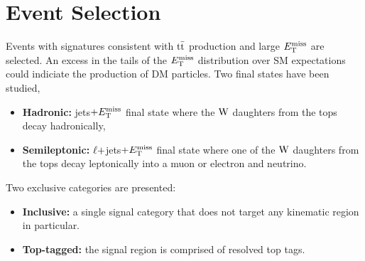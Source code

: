 \section{Event Selection}
\label{sec:selection}

Events with signatures consistent with $\mathrm{t}\bar{\mathrm{t}}$ production and large $E_\mathrm{T}^{\mathrm{miss}}$ are selected. An excess in the tails of the $E_\mathrm{T}^{\mathrm{miss}}$ distribution over SM expectations could indiciate the production of DM particles. Two final states have been studied,
\begin{itemize}
\item \textbf{Hadronic:} jets$+E_\mathrm{T}^{\mathrm{miss}}$ final state where the $\mathrm{W}$ daughters from the tops decay hadronically,
\item \textbf{Semileptonic:} $\ell+$jets$+E_\mathrm{T}^{\mathrm{miss}}$ final state where one of the $\mathrm{W}$ daughters from the tops decay leptonically into a muon or electron and neutrino.
\end{itemize}

Two exclusive categories are presented:
\begin{itemize}

\item \textbf{Inclusive:} a single signal category that does not target any kinematic region in particular.
\item \textbf{Top-tagged:} the signal region is comprised of resolved top tags.%
\end{itemize}



%
\clearpage

\clearpage

\clearpage

